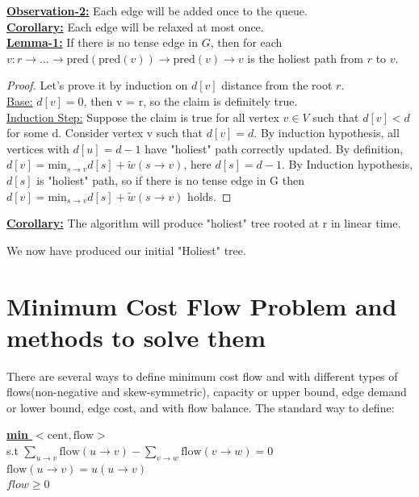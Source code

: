\documentclass{article}
\begin{document}
\textbf{\underline{Observation-2:}} Each edge will be added once to the queue. \\

\textbf{\underline{Corollary:}} Each edge will be relaxed at most once. \\

\textbf{\underline{Lemma-1:}} If there is no tense edge in $G$, then for each $v: r \rightarrow \ldots \rightarrow \text{pred}(\text{pred}(v)) \rightarrow \text{pred}(v) \rightarrow v$ is the holiest path from $r$ to $v$.
\begin{proof} Let's prove it by induction on $d[v]$ distance from the root $r$. \\
\underline{Base:} $d[v] = 0$, then v = r, so the claim is definitely true. \\
\underline{Induction Step:} Suppose the claim is true for all vertex $v \in V$ such that $d[v] < d$ for some d. Consider vertex v such that $d[v] = d$. By induction hypothesis, all vertices with $d[u] = d-1$ have "holiest" path correctly updated. By definition, $d[v] = \text{min}_{s \rightarrow v}{d[s] + \tilde w(s \rightarrow v)}$, here $d[s] = d-1$. By Induction hypothesis, $d[s]$ is "holiest" path, so if there is no tense edge in G then $d[v] = \text{min}_{s \rightarrow v}{d[s] + \tilde w(s \rightarrow v)}$ holds.
\end{proof}

\textbf{\underline{Corollary:}} The algorithm will produce "holiest" tree rooted at r in linear time.

We now have produced our initial "Holiest" tree.

\section{Minimum Cost Flow Problem and methods to solve them}
There are several ways to define minimum cost flow and with different types of flows(non-negative and skew-symmetric), capacity or upper bound, edge demand or lower bound, edge cost, and with flow balance. The standard way to define:
\begin{center}
\begin{algorithm}
\textbf{\underline{min $< \text{cent}, \text{flow}>$}} \\
  s.t  $\sum \limits_{u \rightarrow v} \text{flow} (u \rightarrow v) - \sum \limits_{v \rightarrow w} \text{flow} (v \rightarrow w)= 0 $  \\ \qquad
       $\text{flow}(u \rightarrow v) = u(u \rightarrow v)$ \\ \qquad
       $flow \geq 0$
\end{algorithm}
\end{center}
\end{document}
